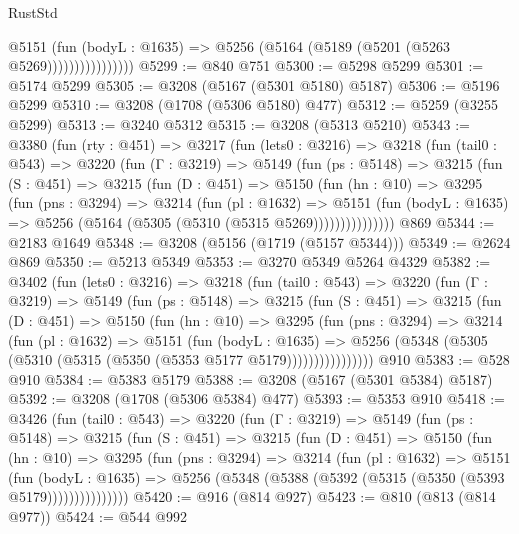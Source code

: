 \begin{lexlean}{RustStd}
\begin{coremodule}
                        @5151
                          (fun (bodyL : @1635) =>
                          @5256 (@5164 (@5189 (@5201 (@5263 @5269))))))))))))))))
@5299 := @840 @751
@5300 := @5298 @5299
@5301 := @5174 @5299
@5305 := @3208 (@5167 (@5301 @5180) @5187)
@5306 := @5196 @5299
@5310 := @3208 (@1708 (@5306 @5180) @477)
@5312 := @5259 (@3255 @5299)
@5313 := @3240 @5312
@5315 := @3208 (@5313 @5210)
@5343 := @3380
    (fun (rty : @451) =>
    @3217
      (fun (lets0 : @3216) =>
      @3218
        (fun (tail0 : @543) =>
        @3220
          (fun (Γ : @3219) =>
          @5149
            (fun (ps : @5148) =>
            @3215
              (fun (S : @451) =>
              @3215
                (fun (D : @451) =>
                @5150
                  (fun (hn : @10) =>
                  @3295
                    (fun (pns : @3294) =>
                    @3214
                      (fun (pl : @1632) =>
                      @5151
                        (fun (bodyL : @1635) =>
                        @5256 (@5164 (@5305 (@5310 (@5315 @5269)))))))))))))))
    @869
@5344 := @2183 @1649
@5348 := @3208 (@5156 (@1719 (@5157 @5344)))
@5349 := @2624 @869
@5350 := @5213 @5349
@5353 := @3270 @5349 @5264 @4329
@5382 := @3402
    (fun (lets0 : @3216) =>
    @3218
      (fun (tail0 : @543) =>
      @3220
        (fun (Γ : @3219) =>
        @5149
          (fun (ps : @5148) =>
          @3215
            (fun (S : @451) =>
            @3215
              (fun (D : @451) =>
              @5150
                (fun (hn : @10) =>
                @3295
                  (fun (pns : @3294) =>
                  @3214
                    (fun (pl : @1632) =>
                    @5151
                      (fun (bodyL : @1635) =>
                      @5256 (@5348 (@5305 (@5310 (@5315 (@5350 (@5353 @5177 @5179))))))))))))))))
    @910
@5383 := @528 @910
@5384 := @5383 @5179
@5388 := @3208 (@5167 (@5301 @5384) @5187)
@5392 := @3208 (@1708 (@5306 @5384) @477)
@5393 := @5353 @910
@5418 := @3426
    (fun (tail0 : @543) =>
    @3220
      (fun (Γ : @3219) =>
      @5149
        (fun (ps : @5148) =>
        @3215
          (fun (S : @451) =>
          @3215
            (fun (D : @451) =>
            @5150
              (fun (hn : @10) =>
              @3295
                (fun (pns : @3294) =>
                @3214
                  (fun (pl : @1632) =>
                  @5151
                    (fun (bodyL : @1635) =>
                    @5256 (@5348 (@5388 (@5392 (@5315 (@5350 (@5393 @5179)))))))))))))))
@5420 := @916 (@814 @927)
@5423 := @810 (@813 (@814 @977))
@5424 := @544 @992

\end{coremodule}
\end{lexlean}
